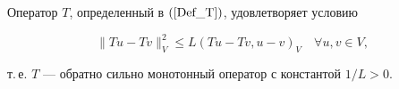 \begin{lem} \label {b21_L5}


Оператор $T$, определенный в $(\ref{Def_T})$, удовлетворяет условию


\begin{equation}


\|T u -T v \|^2_V \leq L (T u -T v, u -v)_V


\quad \forall u, v \in V, \label{d_bz05_5}


\end{equation}


т.\,е. $T$ --- обратно сильно монотонный оператор с константой $1/L> 0$.


\end{lem}





